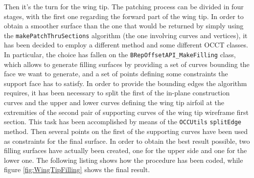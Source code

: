 \bigskip
\noindent
Then it's the turn for the wing tip. The patching process can be divided in four stages, with the first one regarding the forward part of the wing tip. In order to obtain a smoother surface than the one that would be returned by simply using the \lstinline[language=Java]!makePatchThruSections! algorithm (the one involving curves and vertices), it has been decided to employ a different method and some different \gls{OCCT} classes. In particular, the choice has fallen on the \lstinline[language=Java]!BRepOffsetAPI_MakeFilling! class, which allows to generate filling surfaces by providing a set of curves bounding the face we want to generate, and a set of points defining some constraints the support face has to satisfy. In order to provide the bounding edges the algorithm requires, it has been necessary to split the first of the in-plane construction curves and the upper and lower curves defining the wing tip airfoil at the extremities of the second pair of supporting curves of the wing tip wireframe first section. This task has been accomplished by means of the \lstinline[language=Java]!OCCUtils! \lstinline[language=Java]!splitEdge! method. Then several points on the first of the supporting curves have been used as constraints for the final surface. In order to obtain the best result possible, two filling surfaces have actually been created, one for the upper side and one for the lower one. The following listing shows how the procedure has been coded, while figure \ref{fig:WingTipFilling} shows the final result.
%
\bigskip

